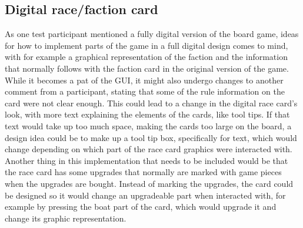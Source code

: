 \subsection{Digital race/faction card}\label{sec:DigiRaceFact}
As one test participant mentioned a fully digital version of the board game, ideas for how to implement parts of the game in a full digital design comes to mind, with for example a graphical representation of the faction and the information that normally follows with the faction card in the original version of the game. While it becomes a pat of the GUI, it might also undergo changes to another comment from a participant, stating that some of the rule information on the card were not clear enough. This could lead to a change in the digital race card's look, with more text explaining the elements of the cards, like tool tips. If that text would take up too much space, making the cards too large on the board, a design idea could be to make up a tool tip box, specifically for text, which would change depending on which part of the race card graphics were interacted with. Another thing in this implementation that needs to be included would be that the race card has some upgrades that normally are marked with game pieces when the upgrades are bought. Instead of marking the upgrades, the card could be designed so it would change an upgradeable part when interacted with, for example by pressing the boat part of the card, which would upgrade it and change its graphic representation.

